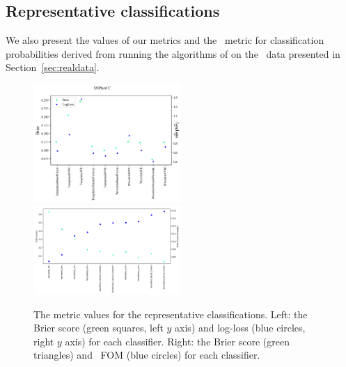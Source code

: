 
\subsection{Representative classifications}
\label{sec:realresults}

We also present the values of our metrics and the \snphotcc\ metric for classification probabilities derived from running the algorithms of \cite{lochner_photometric_2016} on the \snphotcc\ data presented in Section~\ref{sec:realdata}.

\begin{figure}
	\begin{center}
		\includegraphics[width=0.5\textwidth]{./fig/SNPhotCC_res.png}
	  \includegraphics[width=0.5\textwidth]{./fig/fom_vs_brier.png}
		\caption{The metric values for the representative classifications.
		Left: the Brier score (green squares, left $y$ axis) and log-loss (blue circles, right $y$ axis) for each classifier.
		Right: the Brier score (green triangles) and \snphotcc\ FOM (blue circles) for each classifier.
		\label{fig:real_metric_compare}}
	\end{center}
\end{figure}

